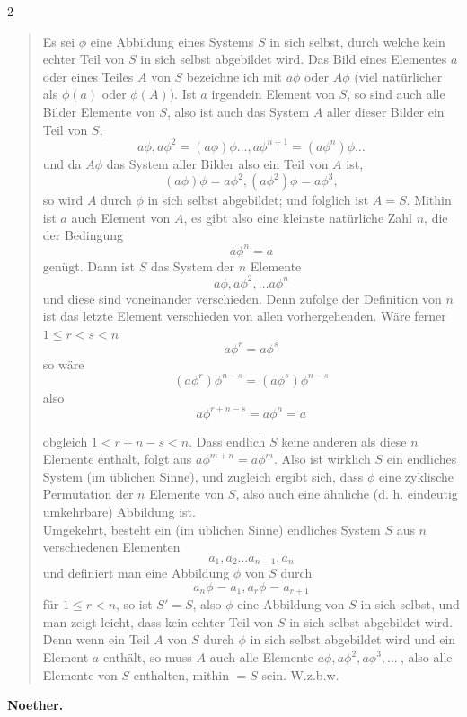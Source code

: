 \documentclass[leqno,hidelinks,10pt]{article}
\theoremstyle{definition}
\begin{document}
\begin{paracol}{2}
\begin{leftcolumn}
\begin{quote}
\hspace{12pt} Es sei $\phi$ eine Abbildung eines Systems $S$ in sich selbst, durch
welche kein echter Teil von $S$ in sich selbst abgebildet wird. Das Bild eines
Elementes $a$ oder eines Teiles $A$ von $S$ bezeichne ich mit $a\phi$ oder $A\phi$
(viel natürlicher als $\phi(a)$ oder $\phi(A)$). Ist $a$ irgendein Element von $S$,
so sind auch alle Bilder Elemente von $S$, also ist auch das System $A$ aller dieser
Bilder ein Teil von $S$,
\[
	a\phi, a\phi^2= (a\phi)\phi \ldots, a\phi^{n+1} = (a\phi^n)\phi \ldots
\]
und da $A\phi$ das System aller Bilder also ein Teil von $A$ ist,
\[
	(a\phi) \phi = a\phi^2, (a\phi^2)\phi = a\phi^3,
\]
so wird $A$ durch $\phi$ in sich selbst abgebildet; und folglich ist $A = S$.
Mithin ist $a$ auch Element von $A$,  es gibt also eine kleinste natürliche Zahl
$n$, die der Bedingung%
\[
	a\phi^n = a
\]
genügt. Dann ist $S$ das System der $n$ Elemente
\[
	a\phi,a\phi^2,\ldots a\phi^n
\]
und diese sind voneinander verschieden. Denn zufolge der Definition von $n$ ist das
letzte Element verschieden von allen vorhergehenden. Wäre ferner $1 \leq r<s < n$%
\[
	a\phi^r = a\phi^s
\]
so wäre \smallskip
\[
	(a\phi^r)\phi^{n-s} = (a\phi^s) \phi^{n-s}
\]
also \smallskip
\[
	a\phi^{r+n-s} = a\phi^n = a
\]

\noindent obgleich $1 < r + n - s < n$. Dass endlich $S$ keine anderen als diese $n$ Elemente
enthält, folgt aus $a\phi^{m + n} = a\phi^m$. Also ist wirklich $S$ ein endliches
System (im üblichen Sinne), und zugleich ergibt sich, dass $\phi$ eine zyklische
Permutation der $n$ Elemente von $S$, also auch eine ähnliche (d. h. eindeutig
umkehrbare) Abbildung ist. \\

\hspace{12pt} Umgekehrt, besteht ein (im üblichen Sinne) endliches System $S$ aus
$n$ verschiedenen Elementen
\[
	a_1, a_2 \ldots a_{n-1}, a_n
\]
und definiert man eine Abbildung $\phi$ von $S$ durch
\[
    a_n\phi = a_1, a_r\phi = a_{r+1}
\]
für $1 \leq r < n$, so ist $S' = S$, also $\phi$ eine Abbildung von $S$ in sich
selbst, und man zeigt leicht, dass kein echter Teil von $S$ in sich selbst
abgebildet wird. Denn wenn ein Teil $A$ von $S$ durch $\phi$ in sich selbst
abgebildet wird und ein Element $a$ enthält, so muss $A$ auch alle Elemente
$a\phi, a\phi^2, a\phi^3, \ldots\ $, also alle Elemente von $S$ enthalten,
mithin $= S$ sein. W.z.b.w.\grqq{}
\end{quote}

\begin{flushright} \textbf{Noether.}\end{flushright}



\end{leftcolumn}
\end{paracol}
\end{document}
